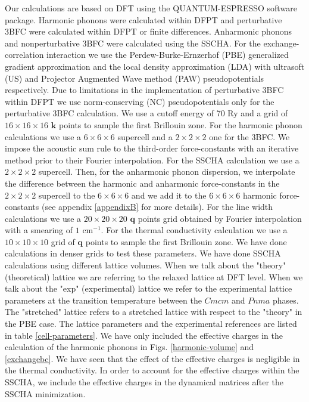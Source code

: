 Our calculations are based on DFT using the QUANTUM-ESPRESSO\cite{giannozzi2009quantum} software package. Harmonic phonons were calculated within DFPT and perturbative 3BFC were calculated within DFPT or finite 
differences\cite{li2014shengbte}. Anharmonic phonons and nonperturbative 3BFC were calculated using the SSCHA. For the exchange-correlation interaction we use the Perdew-Burke-Ernzerhof (PBE) generalized gradient 
approximation and the local density approximation (LDA) with ultrasoft (US) and Projector Augmented Wave method (PAW) pseudopotentials respectively. Due to limitations in the implementation of perturbative 3BFC 
within DFPT we use norm-conserving (NC) pseudopotentials only for the perturbative 3BFC calculation. We use a cutoff 
energy of 70 Ry and a grid of $16\times16\times16$ $\boldsymbol{k}$ points to sample the first Brillouin zone. For 
the harmonic phonon calculations we use a $6\times6\times6$ supercell and a $2\times2\times2$ one for the 3BFC. 
We impose the acoustic sum rule to the third-order force-constants with an iterative method prior to their Fourier
interpolation\cite{paulatto2013anharmonic,aseginolaza2019phonon}. For the SSCHA calculation we use a 
$2\times2\times2$ supercell. Then, for the anharmonic phonon dispersion, we 
interpolate the difference between the harmonic and anharmonic force-constants in the $2\times2\times2$ supercell to 
the $6\times6\times6$ and we add it to the $6\times6\times6$ harmonic force-constants (see appendix \ref{appendixB} 
for more details). For the line width calculations we use a $20\times20\times20$ $\boldsymbol{q}$ points grid 
obtained by Fourier interpolation with a smearing of $1$ cm$^{-1}$. For the thermal conductivity calculation we use 
a $10\times10\times10$ grid of $\boldsymbol{q}$ points to sample the first Brillouin zone. We have done calculations 
in denser grids to test these parameters. We have done SSCHA calculations using different lattice volumes. When we talk about the "theory" (theoretical) lattice we are referring to the relaxed lattice at DFT level. When we talk about the "exp" (experimental) lattice we refer to the experimental lattice parameters at the transition temperature between the $Cmcm$ and $Pnma$ phases. The "stretched" lattice refers to a stretched lattice with respect to the "theory" in the PBE case. The lattice parameters and the experimental references are listed in table \ref{cell-parameters}. We have 
only included the effective charges in the calculation of the harmonic phonons in Figs. \ref{harmonic-volume} and 
\ref{exchangebc}. We have seen that the effect of the effective charges is negligible in the thermal conductivity. 
In order to account for the effective charges within the SSCHA, we include the effective charges in the dynamical 
matrices after the SSCHA minimization.

